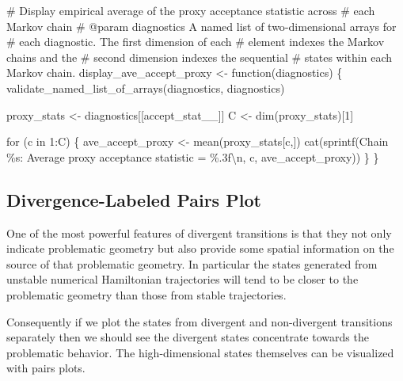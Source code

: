 \documentclass[
  letterpaper,
  DIV=11,
  numbers=noendperiod]{scrartcl}
\newenvironment{Shaded}{\begin{snugshade}}{\end{snugshade}}
\newcommand{\CharTok}[1]{\textcolor[rgb]{0.13,0.47,0.30}{#1}}
\newcommand{\CommentTok}[1]{\textcolor[rgb]{0.37,0.37,0.37}{#1}}
\newcommand{\ControlFlowTok}[1]{\textcolor[rgb]{0.00,0.23,0.31}{#1}}
\newcommand{\DecValTok}[1]{\textcolor[rgb]{0.68,0.00,0.00}{#1}}
\newcommand{\KeywordTok}[1]{\textcolor[rgb]{0.00,0.23,0.31}{#1}}
\newcommand{\NormalTok}[1]{\textcolor[rgb]{0.00,0.23,0.31}{#1}}
\newcommand{\OperatorTok}[1]{\textcolor[rgb]{0.37,0.37,0.37}{#1}}
\newcommand{\SpecialCharTok}[1]{\textcolor[rgb]{0.37,0.37,0.37}{#1}}
\newcommand{\StringTok}[1]{\textcolor[rgb]{0.13,0.47,0.30}{#1}}
\begin{document}
\begin{Shaded}
\begin{Highlighting}[]
\CommentTok{\# Display empirical average of the proxy acceptance statistic across }
\CommentTok{\# each Markov chain}
\CommentTok{\# @param diagnostics A named list of two{-}dimensional arrays for }
\CommentTok{\#                    each diagnostic.  The first dimension of each}
\CommentTok{\#                    element indexes the Markov chains and the }
\CommentTok{\#                    second dimension indexes the sequential }
\CommentTok{\#                    states within each Markov chain.}
\NormalTok{display\_ave\_accept\_proxy }\OperatorTok{\textless{}{-}}\NormalTok{ function(diagnostics) \{}
\NormalTok{  validate\_named\_list\_of\_arrays(diagnostics, }\StringTok{\textquotesingle{}diagnostics\textquotesingle{}}\NormalTok{)}
  
\NormalTok{  proxy\_stats }\OperatorTok{\textless{}{-}}\NormalTok{ diagnostics[[}\StringTok{\textquotesingle{}accept\_stat\_\_\textquotesingle{}}\NormalTok{]]}
\NormalTok{  C }\OperatorTok{\textless{}{-}}\NormalTok{ dim(proxy\_stats)[}\DecValTok{1}\NormalTok{]}

  \ControlFlowTok{for}\NormalTok{ (c }\KeywordTok{in} \DecValTok{1}\NormalTok{:C) \{}
\NormalTok{    ave\_accept\_proxy }\OperatorTok{\textless{}{-}}\NormalTok{ mean(proxy\_stats[c,])}
\NormalTok{    cat(sprintf(}\StringTok{\textquotesingle{}Chain }\SpecialCharTok{\%s}\StringTok{: Average proxy acceptance statistic = }\SpecialCharTok{\%.3f}\CharTok{\textbackslash{}n}\StringTok{\textquotesingle{}}\NormalTok{,}
\NormalTok{                c, ave\_accept\_proxy))}
\NormalTok{  \}}
\NormalTok{\}}
\end{Highlighting}
\end{Shaded}

\subsection{Divergence-Labeled Pairs
Plot}\label{divergence-labeled-pairs-plot}

One of the most powerful features of divergent transitions is that they
not only indicate problematic geometry but also provide some spatial
information on the source of that problematic geometry. In particular
the states generated from unstable numerical Hamiltonian trajectories
will tend to be closer to the problematic geometry than those from
stable trajectories.

Consequently if we plot the states from divergent and non-divergent
transitions separately then we should see the divergent states
concentrate towards the problematic behavior. The high-dimensional
states themselves can be visualized with pairs plots.
\end{document}
